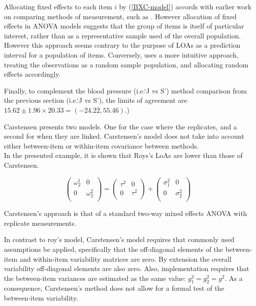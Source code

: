 \documentclass[12pt, a4paper]{report}
\theoremstyle{plain}
\theoremstyle{definition}
\theoremstyle{remark}
\begin{document}
Allocating fixed effects to each item $i$ by (\ref{BXC-model}) accords with earlier work on comparing methods of measurement, such as \citet{Grubbs48}. However allocation of fixed effects in ANOVA models suggests that the group of items is itself of particular interest, rather than as a representative sample used of the overall population. However this approach seems contrary to the purpose of LOAs as a prediction interval for a population of items. Conversely, \citet{ARoy2009}
uses a more intuitive approach, treating the observations as a random sample population, and allocating random effects accordingly.

Finally, to complement the blood pressure (i.e.`J vs S') method comparison from the previous section (i.e.`J vs S'), the limits of agreement are $15.62 \pm 1.96 \times 20.33 = (-24.22, 55.46)$.)

Carstensen presents two models. One for the case where the replicates, and a second for when they are linked.
Carstensen's model does not take into account either between-item or within-item covariance between methods.\\
In the presented example, it is shown that Roys's LoAs are lower than those of Carstensen.




\[\left(\begin{array}{cc}
\omega^1_2  & 0 \\
0 & \omega^2_2 \\
\end{array}  \right)
=  \left(
\begin{array}{cc}
\tau^2  & 0 \\
0 & \tau^2 \\
\end{array} \right)+
\left(
\begin{array}{cc}
\sigma^2_1  & 0 \\
0 & \sigma^2_2 \\
\end{array}\right)
\]

Carstensen's approach is that of a standard two-way mixed effects ANOVA with replicate measurements.

In contrast to roy's model, Carstensen's model requires that commonly used assumptions be applied, specifically that the off-diagonal elements of the between-item and within-item variability matrices are zero. By
extension the overall variability off-diagonal elements are also zero. 
Also, implementation requires that the between-item variances are estimated as the same value: $g^2_1 = g^2_2 = g^2$.
As a consequence, Carstensen's method does not allow for a formal test of the between-item variability.
\end{document}
